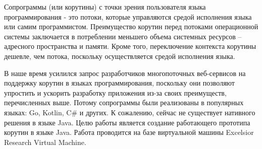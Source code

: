 
Сопрограммы (или корутины) с точки зрения пользователя языка программирования - это потоки, которые управляются средой исполнения языка или самим программистом. Преимущество корутин перед потоками операционной системы заключается в потреблении меньшего объема системных ресурсов – адресного пространства и памяти. Кроме того, переключение контекста корутины дешевле, чем потока, поскольку осуществляется средой исполнения языка. 
\par
В наше время усилился запрос разработчиков многопоточных веб-сервисов на поддержку корутин в языках программирования, поскольку они позволяют упростить и ускорить разработку приложения из-за своих преимуществ, перечисленных выше. Потому сопрограммы были реализованы в популярных языках: Go, Kotlin, C\# и других. К сожалению, сейчас не существует нативного решения в языке Java.
Целю работы является создание работающего прототипа корутин в языке Java. Работа проводится на базе виртуальной машины Excelsior Research Virtual Machine. 

\clearpage

